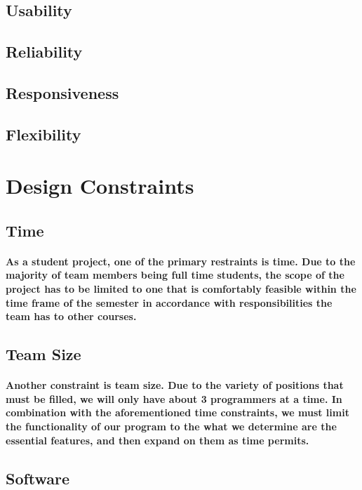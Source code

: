 \documentclass{article}
\begin{document}
\subsection{Usability}
\subsection{Reliability}
\subsection{Responsiveness}
\subsection{Flexibility}

\newpage
\section {Design Constraints}

\subsection{Time}
\paragraph{ \indent As a student project, one of the primary restraints is time. Due to the majority of team members being full time students, the scope of the project has to be limited to one that is comfortably feasible within the time frame of the semester in accordance with responsibilities the team has to other courses.}

\subsection{Team Size}
\paragraph{\indent Another constraint is team size. Due to the variety of positions that must be filled, we will only have about 3 programmers at a time. In combination with the aforementioned time constraints, we must limit the functionality of our program to the what we determine are the essential features, and then expand on them as time permits.}

\subsection{Software}
\end{document}
